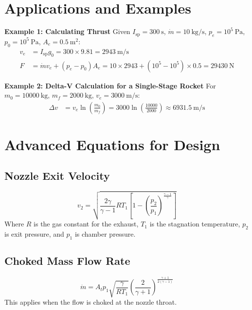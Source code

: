 \documentclass[12pt]{report}
\begin{document}
\section{Applications and Examples}

\textbf{Example 1: Calculating Thrust}
Given $I_{\text{sp}} = 300~\si{\second}$, $\dot{m} = 10~\si{\kilogram\per\second}$, $p_e = 10^5~\si{\pascal}$, $p_0 = 10^5~\si{\pascal}$, $A_e = 0.5~\si{\meter\squared}$:
\begin{align*}
v_e &= I_{\text{sp}} g_0 = 300 \times 9.81 = 2943~\si{\meter\per\second} \\
F &= \dot{m} v_e + (p_e - p_0) A_e = 10 \times 2943 + (10^5 - 10^5) \times 0.5 = 29430~\si{\newton}
\end{align*}

\textbf{Example 2: Delta-V Calculation for a Single-Stage Rocket}
For $m_0 = 10000~\si{\kilogram}$, $m_f = 2000~\si{\kilogram}$, $v_e = 3000~\si{\meter\per\second}$:
\begin{align*}
\Delta v &= v_e \ln\left(\frac{m_0}{m_f}\right) = 3000 \ln\left(\frac{10000}{2000}\right) \approx 6931.5~\si{\meter\per\second}
\end{align*}

\section{Advanced Equations for Design}

\subsection{Nozzle Exit Velocity}
\begin{equation}
v_2 = \sqrt{\frac{2\gamma}{\gamma-1} R T_1 \left[1 - \left(\frac{p_2}{p_1}\right)^{\frac{\gamma-1}{\gamma}}\right]} \label{eq:nozzle_velocity}
\end{equation}
Where $R$ is the gas constant for the exhaust, $T_1$ is the stagnation temperature, $p_2$ is exit pressure, and $p_1$ is chamber pressure.

\subsection{Choked Mass Flow Rate}
\begin{equation}
\dot{m} = A_t p_1 \sqrt{\frac{\gamma}{R T_1}} \left(\frac{2}{\gamma+1}\right)^{\frac{\gamma+1}{2(\gamma-1)}} \label{eq:choked_mass_flow}
\end{equation}
This applies when the flow is choked at the nozzle throat.
\end{document}
